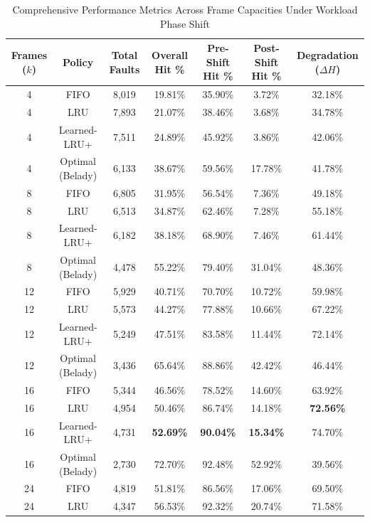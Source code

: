 \documentclass[10pt,twocolumn,a4paper]{article}
\begin{document}
\begin{table}[t]
\centering
\caption{Comprehensive Performance Metrics Across Frame Capacities Under Workload Phase Shift}
\label{tab:sweep_results}
\small
\begin{tabular}{ccccccc}
\toprule
\textbf{Frames ($k$)} & \textbf{Policy} & \textbf{Total Faults} & \textbf{Overall Hit \%} & \textbf{Pre-Shift Hit \%} & \textbf{Post-Shift Hit \%} & \textbf{Degradation ($\Delta H$)} \\
\midrule
4  & FIFO             & 8,019 & 19.81\% & 35.90\% & 3.72\%  & 32.18\% \\
4  & LRU              & 7,893 & 21.07\% & 38.46\% & 3.68\%  & 34.78\% \\
4  & Learned-LRU+     & 7,511 & 24.89\% & 45.92\% & 3.86\%  & 42.06\% \\
4  & Optimal (Belady) & 6,133 & 38.67\% & 59.56\% & 17.78\% & 41.78\% \\
\midrule
8  & FIFO             & 6,805 & 31.95\% & 56.54\% & 7.36\%  & 49.18\% \\
8  & LRU              & 6,513 & 34.87\% & 62.46\% & 7.28\%  & 55.18\% \\
8  & Learned-LRU+     & 6,182 & 38.18\% & 68.90\% & 7.46\%  & 61.44\% \\
8  & Optimal (Belady) & 4,478 & 55.22\% & 79.40\% & 31.04\% & 48.36\% \\
\midrule
12 & FIFO             & 5,929 & 40.71\% & 70.70\% & 10.72\% & 59.98\% \\
12 & LRU              & 5,573 & 44.27\% & 77.88\% & 10.66\% & 67.22\% \\
12 & Learned-LRU+     & 5,249 & 47.51\% & 83.58\% & 11.44\% & 72.14\% \\
12 & Optimal (Belady) & 3,436 & 65.64\% & 88.86\% & 42.42\% & 46.44\% \\
\midrule
16 & FIFO             & 5,344 & 46.56\% & 78.52\% & 14.60\% & 63.92\% \\
16 & LRU              & 4,954 & 50.46\% & 86.74\% & 14.18\% & \textbf{72.56\%} \\
16 & Learned-LRU+     & 4,731 & \textbf{52.69\%} & \textbf{90.04\%} & \textbf{15.34\%} & 74.70\% \\
16 & Optimal (Belady) & 2,730 & 72.70\% & 92.48\% & 52.92\% & 39.56\% \\
\midrule
24 & FIFO             & 4,819 & 51.81\% & 86.56\% & 17.06\% & 69.50\% \\
24 & LRU              & 4,347 & 56.53\% & 92.32\% & 20.74\% & 71.58\% \\

\end{tabular}
\end{table}
\end{document}
